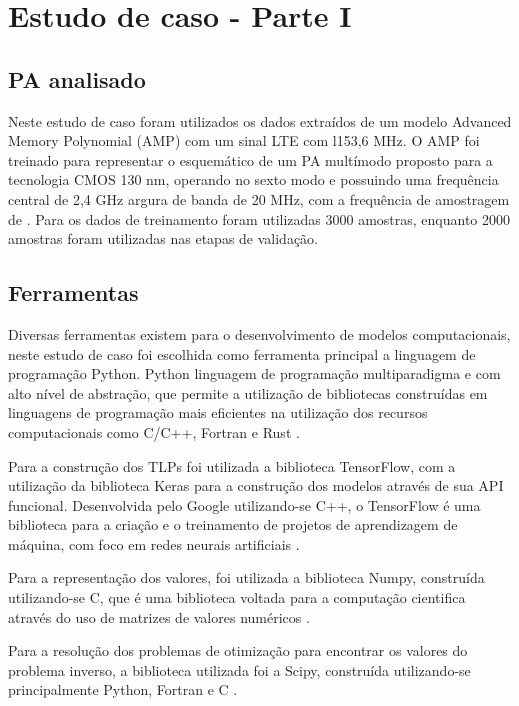 \chapter{Estudo de caso - Parte I} \label{cha:estudoi}
\section{PA analisado} \label{sec:estudoi-pa}
Neste estudo de caso foram utilizados os dados extraídos de um modelo Advanced Memory Polynomial (AMP) com um sinal LTE com l153,6 MHz. O AMP foi treinado para representar o esquemático de um PA multímodo proposto para a tecnologia CMOS 130 nm, operando no sexto modo e possuindo uma frequência central de 2,4 GHz argura de banda de 20 MHz, com a frequência de amostragem de \cite{dos2017fully} \cite{schuartz2019reduced}. Para os dados de treinamento foram utilizadas 3000 amostras, enquanto 2000 amostras foram utilizadas nas etapas de validação.

\section{Ferramentas} \label{sec:estudoi-ferr}
Diversas ferramentas existem para o desenvolvimento de modelos computacionais, neste estudo de caso foi escolhida como ferramenta principal a linguagem de programação Python. Python linguagem de programação multiparadigma e com alto nível de abstração, que permite a utilização de bibliotecas construídas em linguagens de programação mais eficientes na utilização dos recursos computacionais como C/C++, Fortran e Rust \cite{Ramalho2022-zg}.

Para a construção dos TLPs foi utilizada a biblioteca TensorFlow, com a utilização da biblioteca Keras para a construção dos modelos através de sua API funcional. Desenvolvida pelo Google utilizando-se C++, o TensorFlow é uma biblioteca para a criação e o treinamento de projetos de aprendizagem de máquina, com foco em redes neurais artificiais \cite{tensorflow2015-whitepaper}.

Para a representação dos valores, foi utilizada a biblioteca Numpy, construída utilizando-se C, que é uma biblioteca voltada para a computação cientifica através do uso de matrizes de valores numéricos \cite{harris2020array}.

Para a resolução dos problemas de otimização para encontrar os valores do problema inverso, a biblioteca utilizada foi a Scipy, construída utilizando-se principalmente Python, Fortran e C \cite{2020SciPy-NMeth}.

